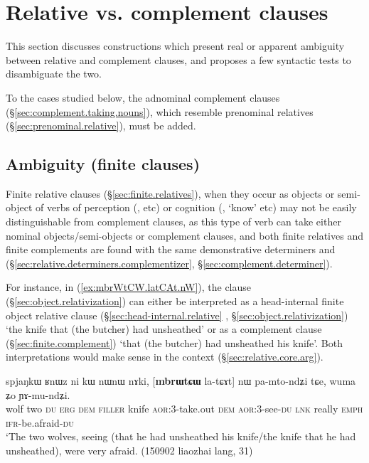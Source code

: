  
\section{Relative vs. complement clauses}  \label{sec:relative.complement.ambiguities}
This section discusses constructions which present real or apparent ambiguity between relative and complement clauses, and proposes a few syntactic tests to disambiguate the two.

To the cases studied below, the adnominal complement clauses (§\ref{sec:complement.taking.nouns}), which resemble prenominal relatives (§\ref{sec:prenominal.relative}), must be added.


\subsection{Ambiguity (finite clauses)} \label{sec:finite.relative.complement.ambiguity}
Finite relative clauses (§\ref{sec:finite.relatives}), when they occur as objects or semi-object of verbs of perception (,  etc) or cognition (, `know' etc) may not be easily distinguishable from complement clauses, as this type of verb can take either nominal objects/semi-objects or complement clauses, and both finite relatives and finite complements are found with the same demonstrative determiners  and  (§\ref{sec:relative.determiners.complementizer}, §\ref{sec:complement.determiner}).

For instance, in (\ref{ex:mbrWtCW.latCAt.nW}), the clause  (§\ref{sec:object.relativization}) can either be interpreted as a head-internal finite object relative clause (§\ref{sec:head-internal.relative} , §\ref{sec:object.relativization}) `the knife that (the butcher) had unsheathed' or as a complement clause (§\ref{sec:finite.complement}) `that (the butcher) had unsheathed his knife'. Both interpretations would make sense in the context (§\ref{sec:relative.core.arg}).

\begin{exe}
\ex \label{ex:mbrWtCW.latCAt.nW}
\gll spjaŋkɯ ʁnɯz ni kɯ nɯnɯ nɤki, [\textbf{mbrɯtɕɯ} la-tɕɤt] nɯ pa-mto-ndʑi tɕe, wuma ʑo ɲɤ-mu-ndʑi. \\
wolf two \textsc{du} \textsc{erg} \textsc{dem} \textsc{filler} knife \textsc{aor}:3\flobv{}-take.out \textsc{dem} \textsc{aor}:3\flobv{}-see-\textsc{du} \textsc{lnk} really \textsc{emph} \textsc{ifr}-be.afraid-\textsc{du} \\
\glt `The two wolves, seeing (that he had unsheathed his knife/the knife that he had unsheathed), were very afraid. (150902 liaozhai lang, 31)
\end{exe}

